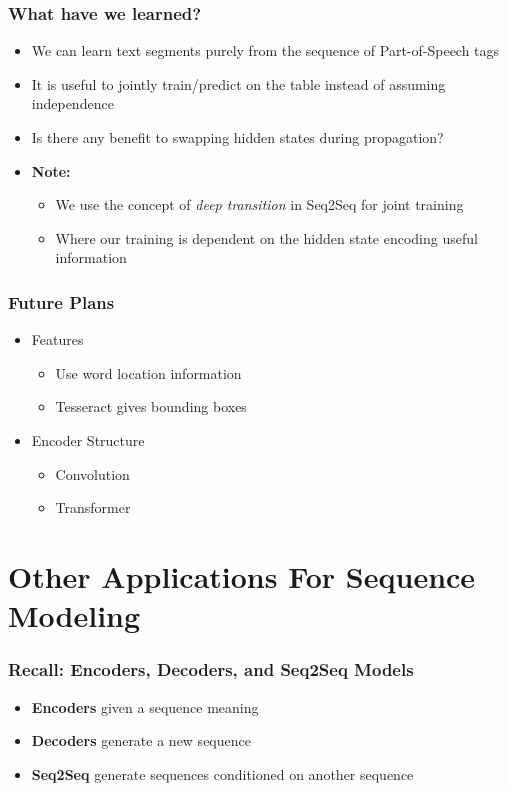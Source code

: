 \documentclass[usenames,dvipsnames]{beamer}
\begin{document}
\begin{frame}
  \frametitle{What have we learned?}
  \begin{itemize}
    \item We can learn text segments purely from the sequence of Part-of-Speech tags
    \item It is useful to jointly train/predict on the table instead of assuming independence
    \item Is there any benefit to swapping hidden states during propagation?
    \item \textbf{Note:}
    \begin{itemize}
      \item We use the concept of \textit{deep transition} in Seq2Seq for joint training
      \item Where our training is dependent on the hidden state encoding useful information
    \end{itemize}
  \end{itemize}
\end{frame}


\begin{frame}
  \frametitle{Future Plans}
  \begin{itemize}
    \item Features
    \begin{itemize}
      \item Use word location information
      \item Tesseract gives bounding boxes
    \end{itemize}
    \item Encoder Structure
    \begin{itemize}
      \item Convolution
      \item Transformer
    \end{itemize}
  \end{itemize}
\end{frame}



\section{Other Applications For Sequence Modeling}

\begin{frame}
\frametitle{Recall: Encoders, Decoders, and Seq2Seq Models}
\begin{itemize}
  \item \textbf{Encoders} given a sequence meaning
  \item \textbf{Decoders} generate a new sequence
  \item \textbf{Seq2Seq} generate sequences conditioned on another sequence
\end{itemize}
\end{frame}
\end{document}
